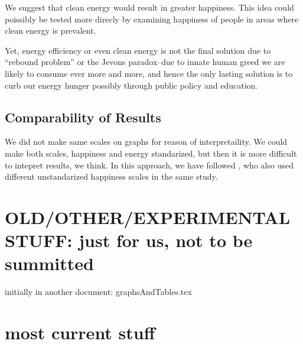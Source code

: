 \documentclass[10pt, letterpaper]{article}
\begin{document}
\begin{spacing}{1.4}
We suggest that clean energy would result in greater happiness. This idea could
poissibly be tested more direcly by examining happiness of people in areas where
clean energy is prevalent. 


Yet, energy efficiency or even clean energy is not the final solution due to
``rebound problem'' or the Jevons paradox--due to innate human greed we are
likely to consume ever more and more, and hence the only lasting solution is to
curb our energy hunger possibly through public policy and education.


\subsection{Comparability of Results}

We did not make same scales on graphs for reason of interpretaility. We could
make both scales, happiness and energy standarized, but then it is more
difficult to intepret results, we think. In this approach, we have followed
\cite{easterlin10B,easterlin12}, who also used different unstandarized
happiness scales in the same study. 



\newpage
\section{\huge OLD/OTHER/EXPERIMENTAL STUFF: just for us, not to be summitted} initially in another document: graphsAndTables.tex

\section{most current stuff}


\end{spacing}
\end{document}
